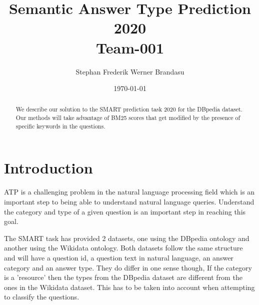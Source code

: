 \documentclass[sigconf]{acmart}
\begin{document}

\title{%
  Semantic Answer Type Prediction 2020 \\
  \large Team-001}

\author{Stephan Frederik Werner Brandasu}

\date{\today}



\begin{abstract}
We describe our solution to the \gls{SMART} prediction task 2020 for the DBpedia dataset. Our methods will take advantage of BM25 scores that get modified by the presence of specific keywords in the questions.
\end{abstract}


\renewcommand\footnotetextcopyrightpermission[1]{}
\pagestyle{plain}

\maketitle

\section{Introduction}
\gls{ATP} is a challenging problem in the natural language processing field which is an important step to being able to understand natural language queries. Understand the category and type of a given question is an important step in reaching this goal.

The \gls{SMART} task has provided 2 datasets, one using the DBpedia ontology and another using the Wikidata ontology.
Both datasets follow the same structure and will have a question id, a question text in natural language, an answer category and an answer type. They do differ in one sense though, If the category is a 'resource' then the types from the DBpedia dataset are different from the ones in the Wikidata dataset. This has to be taken into account when attempting to classify the questions.
\end{document}
